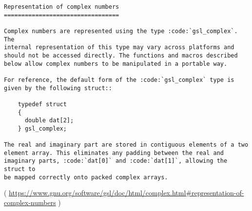 \begin{lstlisting}
Representation of complex numbers
=================================

Complex numbers are represented using the type :code:`gsl_complex`. The
internal representation of this type may vary across platforms and
should not be accessed directly. The functions and macros described
below allow complex numbers to be manipulated in a portable way.

For reference, the default form of the :code:`gsl_complex` type is
given by the following struct::

    typedef struct
    {
      double dat[2];
    } gsl_complex;

The real and imaginary part are stored in contiguous elements of a two
element array. This eliminates any padding between the real and
imaginary parts, :code:`dat[0]` and :code:`dat[1]`, allowing the struct to
be mapped correctly onto packed complex arrays.
\end{lstlisting}
( \url{https://www.gnu.org/software/gsl/doc/html/complex.html#representation-of-complex-numbers} )
\fi

